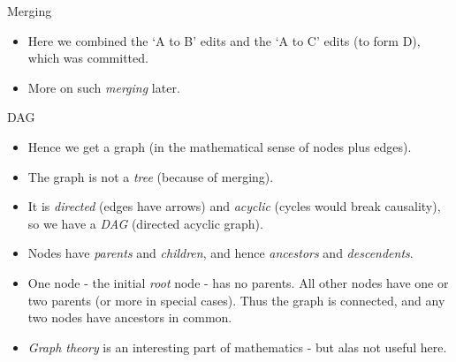\documentclass[usenames,dvipsnames]{beamer}
\begin{document}
\begin{frame}{Merging}
  \begin{figure}
    \begin{center}
    \end{center}
  \end{figure}
  \begin{block}{}
    \begin{itemize}
      \item{Here we combined the `A to B' edits and the `A to C' edits (to form D), which was committed.}
      \item{More on such \textit{merging} later.}
    \end{itemize}
  \end{block}
\end{frame}

\begin{frame}{DAG}
  \begin{block}{}
    \begin{itemize}
      \item{Hence we get a graph (in the mathematical sense of nodes plus edges).}
      \item{The graph is not a \textit{tree} (because of merging).}
      \item{It is \textit{directed} (edges have arrows) and \textit{acyclic} (cycles would break causality), so we have a \textit{DAG} (directed acyclic graph).}
      \item{Nodes have \textit{parents} and \textit{children}, and hence \textit{ancestors} and \textit{descendents}.}
      \item{One node - the initial \textit{root} node - has no parents. All other nodes have one or two parents (or more in special cases). Thus the graph is connected, and any two nodes have ancestors in common.}
      \item{\textit{Graph theory} is an interesting part of mathematics - but alas not useful here.}
    \end{itemize}
  \end{block}
\end{frame}
\end{document}
